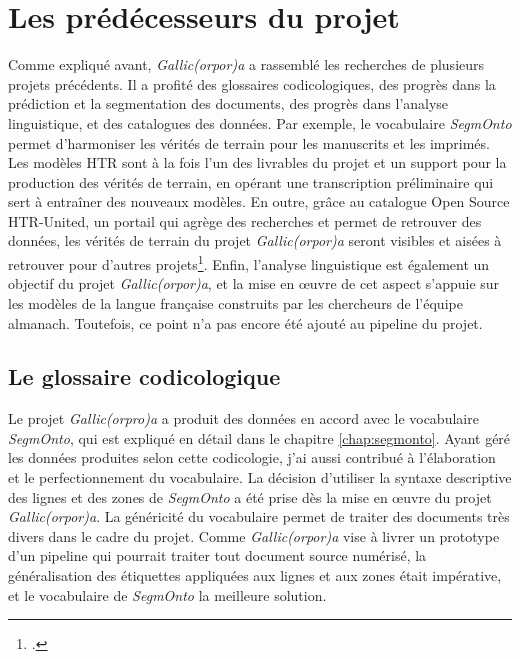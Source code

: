 \documentclass[class=article, crop=false]{standalone}
\begin{document}
\section{Les prédécesseurs du projet}
Comme expliqué avant, \textit{Gallic(orpor)a} a rassemblé les recherches de plusieurs projets précédents. Il a profité des glossaires codicologiques, des progrès dans la prédiction et la segmentation des documents, des progrès dans l'analyse linguistique, et des catalogues des données. Par exemple, le vocabulaire \textit{SegmOnto} permet d'harmoniser les vérités de terrain pour les manuscrits et les imprimés. Les modèles \acrshort{HTR} sont à la fois l'un des livrables du projet et un support pour la production des vérités de terrain, en opérant une transcription préliminaire qui sert à entraîner des nouveaux modèles. En outre, grâce au catalogue Open Source \Gls{HTR-United}, un portail qui agrège des recherches et permet de retrouver des données, les vérités de terrain du projet \textit{Gallic(orpor)a} seront visibles et aisées à retrouver pour d'autres projets\footcite{chagueSharingHTRDatasets2022}. Enfin, l'analyse linguistique est également un objectif du projet \textit{Gallic(orpor)a}, et la mise en œuvre de cet aspect s'appuie sur les modèles de la langue française construits par les chercheurs de l'équipe \acrshort{almanach}. Toutefois, ce point n'a pas encore été ajouté au pipeline du projet.


\subsection{Le glossaire codicologique}
Le projet \textit{Gallic(orpro)a} a produit des données en accord avec le vocabulaire \textit{SegmOnto}, qui est expliqué en détail dans le chapitre \ref{chap:segmonto}. Ayant géré les données produites selon cette codicologie, j'ai aussi contribué à l'élaboration et le perfectionnement du vocabulaire. La décision d'utiliser la syntaxe descriptive des lignes et des zones de \textit{SegmOnto} a été prise dès la mise en œuvre du projet \textit{Gallic(orpor)a}. La généricité du vocabulaire permet de traiter des documents très divers dans le cadre du projet. Comme \textit{Gallic(orpor)a} vise à livrer un prototype d'un pipeline qui pourrait traiter tout document source numérisé, la généralisation des étiquettes appliquées aux lignes et aux zones était impérative, et le vocabulaire de \textit{SegmOnto} la meilleure solution.
\end{document}
